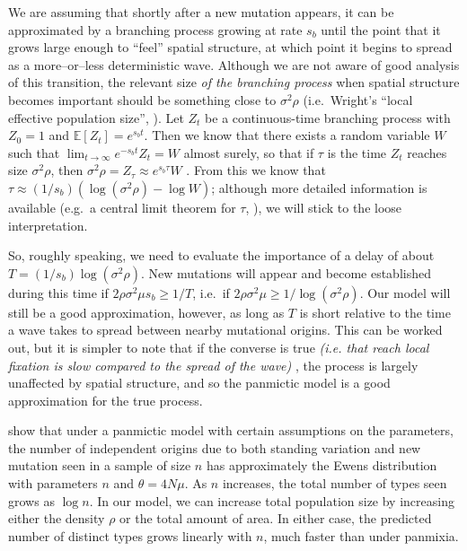 \documentclass{article}
\newcommand{\gc}[1]{{\it\color{blue} #1} }
\newcommand{\mfp}[1]{{\it\color{red} #1} }
\newcommand{\E}{\mathbb{E}}
\begin{document}
We are assuming that shortly after a new mutation appears, 
it can be approximated by a branching process growing at rate \gc{$s_b$}
until the point that it grows large enough to ``feel'' spatial structure,
at which point it begins to spread as a more--or--less deterministic wave.
Although we are not aware of good analysis of this transition, 
the relevant size \gc{of the branching process} when spatial structure becomes important
should be something close to $\sigma^2 \rho$ 
(i.e.\ Wright's ``local effective population size'', \citet{Wright:43}).
Let $Z_t$ be a continuous-time branching process with $Z_0=1$ and $\E[Z_t] = e^{s_b t}$.
Then we know that there exists a random variable $W$ such that $\lim_{t\to\infty} e^{-s_b t} Z_t = W$ almost surely,
so that if $\tau$ is the time $Z_t$ reaches size $\sigma^2 \rho$, %
then $\sigma^2 \rho = Z_\tau \approx e^{s_b \tau} W$ \citep{jagers1975branching}.
From this we know that $\tau \approx (1/s_b) (\log (\sigma^2 \rho) - \log W)$;
although more detailed information is available (e.g.\ a central limit theorem for $\tau$, \citet{nagaev1971limit}),
we will stick to the loose interpretation.

So, roughly speaking, we need to evaluate the importance of a delay of about $T = (1/s_b) \log (\sigma^2 \rho)$.
New mutations will appear and become established during this time if
$2 \rho \sigma^2 \mu s_b \ge 1/T$,
i.e.\ if $2 \rho \sigma^2 \mu \ge 1/\log (\sigma^2 \rho)$.
Our model will still be a good approximation, however, 
as long as $T$ is short relative to the time a wave takes to spread between nearby mutational origins.
This can be worked out,
but it is simpler to note that if the converse is true \mfp{(i.e. that
reach local fixation is slow compared to the spread of the wave)}, 
the process is largely unaffected by spatial structure,
and so the panmictic model is a good approximation for the true process.


\citet{softsweepsII} show that under a panmictic model with certain assumptions on the parameters,
the number of independent origins due to both standing variation and new mutation seen in a sample of size $n$
has approximately the Ewens distribution with parameters $n$ and $\theta = 4 N \mu$.
As $n$ increases, the total number of types seen grows as $\log n$.
In our model, we can increase total population size by increasing either the density $\rho$ or the total amount of area.
In either case, the predicted number of distinct types grows linearly with $n$,
much faster than under panmixia.
\end{document}
